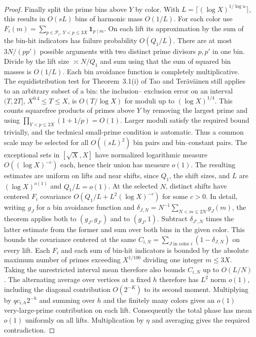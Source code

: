 \documentclass[11pt,letterpaper]{article}
\begin{document}
\begin{proof}
Finally split the prime bins above $Y$ by color. With
$L=\lceil(\log X)^{1/\log u}\rceil$, this results in $O(sL)$ bins
of harmonic mass $O(1/L)$. For each color use
$F_i(m)=\sum_{p\in\mathcal P_i,\,Y<p\le3X}\mathbf1_{p\mid m}$.
On each lift its approximation by the sum of the bin-hit indicators
has failure probability $O(Q_1/L)$. There are at most
$3N/(pp')$ possible arguments with two distinct prime divisors $p,p'$
in one bin. Divide by the lift size $\asymp N/Q_1$ and sum using that
the sum of squared bin masses is $O(1/L)$. Each bin avoidance function is completely multiplicative.
The equidistribution test for Theorem~3.1(i) of Tao and Ter\"av\"ainen
\cite{tt} still applies to an arbitrary subset of a bin: the inclusion--
exclusion error on an interval $(T,2T]$, $X^{0.4}\le T\le X$, is
$O(T/\log X)$ for moduli up to $(\log X)^{1/4}$. This counts squarefree
products of primes above $Y$ by removing the largest prime and using
$\prod_{Y<p\le2X}(1+1/p)=O(1)$. Larger moduli satisfy the required
bound trivially, and the technical small-prime condition is automatic.
Thus a common scale may be selected for all $O((sL)^2)$ bin
pairs and bin--constant pairs. The exceptional sets in $[\sqrt X,X]$ have normalized logarithmic measure $O((\log X)^{-c})$ each, hence their union has measure $o(1)$. The resulting estimates are uniform on lifts and near
shifts, since $Q_1$, the shift sizes, and $L$ are $(\log X)^{o(1)}$
and $Q_1/L=o(1)$. At the selected $N$, distinct shifts have centered
$F_i$ covariance $O(Q_1/L+L^2(\log X)^{-c})$ for some $c>0$. In detail, writing $g_J$ for a bin avoidance function and
$\delta_{J,N}=N^{-1}\sum_{N<m\le2N}g_J(m)$, the theorem applies
both to $(g_J,g_{J'})$ and to $(g_J,1)$. Subtract $\delta_{J',N}$
times the latter estimate from the former and sum over both bins in
the given color. This bounds the covariance centered at the same
$C_{i,N}=\sum_{J\text{ in color }i}(1-\delta_{J,N})$ on every lift.
Each $F_i$ and each sum of bin-hit indicators is bounded by the
absolute maximum number of primes exceeding $X^{1/100}$ dividing
one integer $m\le3X$. Taking the unrestricted interval mean therefore
also bounds $C_{i,N}$ up to $O(L/N)$. The alternating
average over vertices at a fixed $h$ therefore has $L^2$ norm $o(1)$,
including the diagonal contribution $O(2^{-K})$ to its second moment.
Multiplying by $q c_{i,h}2^{-h}$ and summing over $h$ and the finitely
many colors gives an $o(1)$ very-large-prime contribution on each lift.
Consequently the total phase has mean $o(1)$ uniformly on all lifts.
Multiplication by $\eta$ and averaging gives the required contradiction.
\end{proof}
\end{document}
